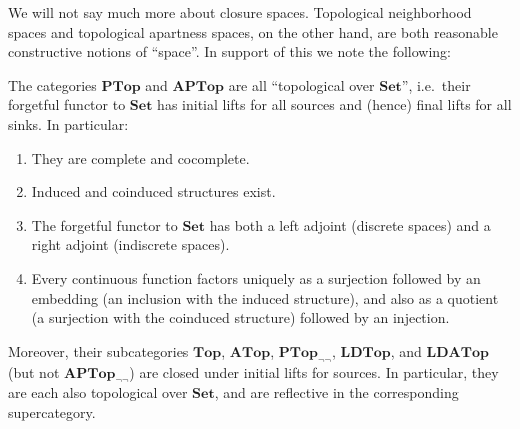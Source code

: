 \documentclass{article}
\def\nn{\ensuremath{\neg\neg}}
\def\Set{\mathbf{Set}}
\def\PTop{\mathbf{PTop}}
\def\Top{\mathbf{Top}}
\def\PTopnn{\mathbf{PTop}_{\nn}}
\def\LDTop{\mathbf{LDTop}}
\def\APTop{\mathbf{APTop}}
\def\ATop{\mathbf{ATop}}
\def\APTopnn{\mathbf{APTop}_{\nn}}
\def\LDATop{\mathbf{LDATop}}
\begin{document}
We will not say much more about closure spaces.
Topological neighborhood spaces and topological apartness spaces, on the other hand, are both reasonable constructive notions of ``space''.
In support of this we note the following:

\begin{thm}\label{thm:top-topconcrete}
  The categories $\PTop$ and $\APTop$ are all ``topological over $\Set$'', i.e.\ their forgetful functor to $\Set$ has initial lifts for all sources and (hence) final lifts for all sinks.
  In particular:
  \begin{enumerate}
  \item They are complete and cocomplete.
  \item Induced and coinduced structures exist.
  \item The forgetful functor to $\Set$ has both a left adjoint (discrete spaces) and a right adjoint (indiscrete spaces).
  \item Every continuous function factors uniquely as a surjection followed by an embedding (an inclusion with the induced structure), and also as a quotient (a surjection with the coinduced structure) followed by an injection.
  \end{enumerate}
  Moreover, their subcategories $\Top$, $\ATop$, $\PTopnn$, $\LDTop$, and $\LDATop$ (but not $\APTopnn$) are closed under initial lifts for sources.
  In particular, they are each also topological over $\Set$, and are reflective in the corresponding supercategory.
\end{thm}
\end{document}
